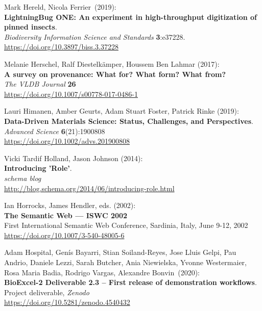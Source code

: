 \begin{thebibliography}{9}
Mark Hereld, Nicola Ferrier~(2019):\\
\textbf{LightningBug ONE: An experiment in high-throughput digitization of pinned insects}.\\
\emph{Biodiversity Information Science and Standards} \textbf{3}:e37228.\\
\url{https://doi.org/10.3897/biss.3.37228}

Melanie Herschel, Ralf Diestelkämper, Houssem Ben Lahmar (2017):\\
\textbf{A survey on provenance: What for? What form? What from?}\\
\emph{The VLDB Journal} \textbf{26}\\
\url{https://doi.org/10.1007/s00778-017-0486-1}

Lauri Himanen, Amber Geurts, Adam Stuart Foster, Patrick Rinke (2019):\\
\textbf{Data-Driven Materials Science: Status, Challenges, and Perspectives}.\\
\emph{Advanced Science} \textbf{6}(21):1900808\\
\url{https://doi.org/10.1002/advs.201900808}



Vicki Tardif Holland, Jason Johnson (2014): \\
\textbf{Introducing '{Role}'}.\\
\emph{schema blog}\\
\url{http://blog.schema.org/2014/06/introducing-role.html}

Ian Horrocks, James Hendler, eds. (2002): \\
\textbf{The {Semantic Web} --- {ISWC} 2002} \\
First International Semantic Web Conference, Sardinia, Italy, June 9-12, 2002\\
\url{https://doi.org/10.1007/3-540-48005-6}

Adam Hospital, Genís Bayarri, Stian Soiland-Reyes, Jose Lluis
Gelpi, Pau Andrio, Daniele Lezzi, Sarah Butcher, Ania Niewielska, Yvonne
Westermaier, Rosa Maria Badia, Rodrigo Vargas, Alexandre Bonvin~(2020):\\
\textbf{BioExcel-2 Deliverable 2.3 -- First release of demonstration
workflows}.\\
Project deliverable, \emph{Zenodo}\\
\url{https://doi.org/10.5281/zenodo.4540432}


\end{thebibliography}
